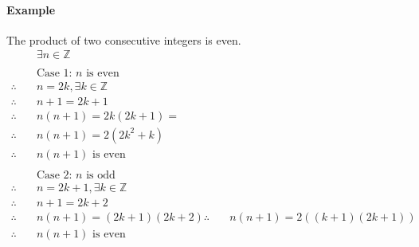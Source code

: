 \paragraph*{Example}
The product of two consecutive integers is even.
\begin{align*}
    & \exists n \in \mathbb{Z}\\
    \\
    & \text{Case 1: } n \text{ is even}\\
    \therefore \quad & n = 2k, \exists k \in \mathbb{Z}\\
    \therefore \quad & n + 1 = 2k + 1\\
    \therefore \quad & n(n+1) = 2k(2k+1) = \\
    \therefore \quad & n(n+1) = 2(2k^2 + k)\\
    \therefore \quad & n(n+1) \text{ is even}\\
    \\
    & \text{Case 2: } n \text{ is odd}\\
    \therefore \quad & n = 2k + 1, \exists k \in \mathbb{Z}\\
    \therefore \quad & n + 1 = 2k + 2\\
    \therefore \quad & n(n+1) = (2k + 1)(2k + 2)
    \therefore \quad & n(n+1) = 2((k + 1)(2k + 1))\\
    \therefore \quad & n(n+1) \text{ is even}
\end{align*}

